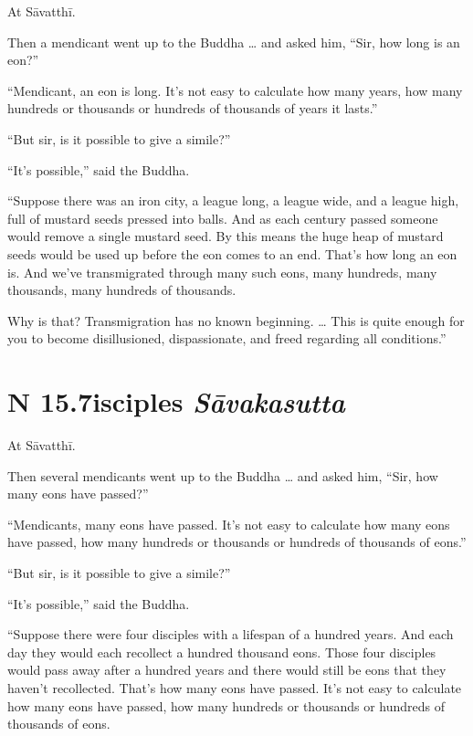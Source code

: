 \documentclass[12pt,openany]{book}%
\newcommand*{\suttatitleacronym}[1]{\smaller[2]{#1}\vspace*{.3em}}
\newcommand*{\suttatitletranslation}[1]{\linebreak{#1}}
\newcommand*{\suttatitleroot}[1]{\linebreak\smaller[2]\itshape{#1}}
\newcommand*{\tocacronym}[1]{\hspace*{-3.3em}{#1}\quad}
\newcommand*{\toctranslation}[1]{#1}
\newcommand*{\tocroot}[1]{(\textit{#1})}
\begin{document}
At \textsanskrit{Sāvatthī}. 

Then a mendicant went up to the Buddha … and asked him, “Sir, how long is an eon?” 

“Mendicant, an eon is long. It’s not easy to calculate how many years, how many hundreds or thousands or hundreds of thousands of years it lasts.” 

“But sir, is it possible to give a simile?” 

“It’s possible,” said the Buddha. 

“Suppose there was an iron city, a league long, a league wide, and a league high, full of mustard seeds pressed into balls. And as each century passed someone would remove a single mustard seed. By this means the huge heap of mustard seeds would be used up before the eon comes to an end. That’s how long an eon is. And we’ve transmigrated through many such eons, many hundreds, many thousands, many hundreds of thousands. 

Why is that? Transmigration has no known beginning. … This is quite enough for you to become disillusioned, dispassionate, and freed regarding all conditions.” 

%
\section*{{\suttatitleacronym SN 15.7}{\suttatitletranslation Disciples }{\suttatitleroot Sāvakasutta}}
\addcontentsline{toc}{section}{\tocacronym{SN 15.7} \toctranslation{Disciples } \tocroot{Sāvakasutta}}

At \textsanskrit{Sāvatthī}. 

Then several mendicants went up to the Buddha … and asked him, “Sir, how many eons have passed?” 

“Mendicants, many eons have passed. It’s not easy to calculate how many eons have passed, how many hundreds or thousands or hundreds of thousands of eons.” 

“But sir, is it possible to give a simile?” 

“It’s possible,” said the Buddha. 

“Suppose there were four disciples with a lifespan of a hundred years. And each day they would each recollect a hundred thousand eons. Those four disciples would pass away after a hundred years and there would still be eons that they haven’t recollected. That’s how many eons have passed. It’s not easy to calculate how many eons have passed, how many hundreds or thousands or hundreds of thousands of eons. 
\end{document}
